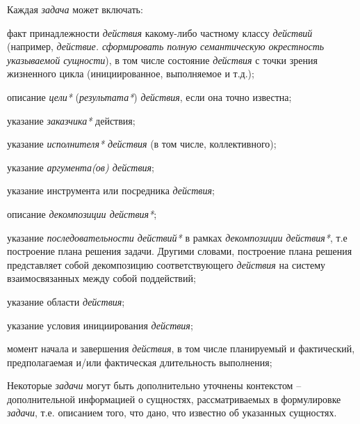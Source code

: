 \begin{SCn}
{	Каждая \textit{задача} может включать:
	\begin{scnitemize}
		\item факт принадлежности \textit{действия} какому-либо частному классу \textit{действий} (например,\textit{ действие. сформировать полную семантическую окрестность указываемой сущности}), в том числе состояние \textit{действия} с точки зрения жизненного цикла (инициированное, выполняемое и т.д.);
		\item описание \textit{цели*} (\textit{результата*}) \textit{действия}, если она точно известна;
		\item указание \textit{заказчика*} действия;
		\item указание \textit{исполнителя* действия} (в том числе, коллективного);
		\item указание \textit{аргумента(ов) действия\scnrolesign};
		\item указание инструмента или посредника \textit{действия};
		\item описание \textit{декомпозиции действия*};
		\item указание \textit{последовательности действий*} в рамках \textit{декомпозиции действия*}, т.е построение плана решения задачи. Другими словами, построение плана решения представляет собой декомпозицию соответствующего \textit{действия} на систему взаимосвязанных между собой поддействий;
		\item указание области \textit{действия};
		\item указание условия инициирования \textit{действия};
		\item момент начала и завершения \textit{действия}, в том числе планируемый и фактический, предполагаемая и/или фактическая длительность выполнения;
	\end{scnitemize}
	Некоторые \textit{задачи} могут быть дополнительно уточнены контекстом -- дополнительной информацией о сущностях, рассматриваемых в формулировке \textit{задачи}, т.е. описанием того, что дано, что известно об указанных сущностях.
	
}
\end{SCn}
